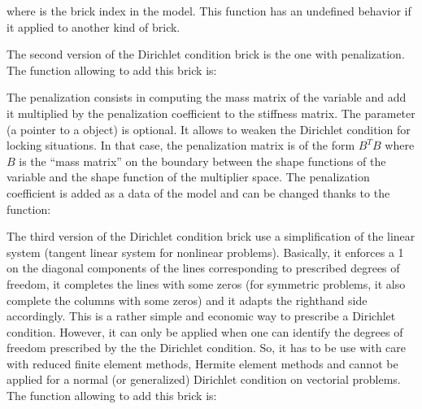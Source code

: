 \documentclass[a4paper,11pt,english]{sphinxmanual}
\begin{document}
where  is the brick index in the model. This function has an
undefined behavior if it applied to another kind of brick.

The second version of the Dirichlet condition brick is the one with penalization.
The function allowing to add this brick is:

\begin{sphinxVerbatim}[commandchars=\\\{\}]
  
                                           
                                            
                                            
\end{sphinxVerbatim}

The penalization consists in computing the mass matrix of the variable and add it
multiplied by the penalization coefficient to the stiffness matrix.
The parameter  (a pointer to a  object) is optional. It allows to weaken the Dirichlet condition for locking situations. In that case, the penalization matrix is of the form \(B^TB\) where \(B\) is the “mass matrix” on the boundary between the shape functions of the variable  and the shape function of the multiplier space.
The penalization coefficient is added as a data of the model and can be
changed thanks to the function:

\begin{sphinxVerbatim}[commandchars=\\\{\}]
  
\end{sphinxVerbatim}

The third version of the Dirichlet condition brick use a simplification of the linear system (tangent linear system for nonlinear problems). Basically, it enforces a 1 on the diagonal components of the lines corresponding to prescribed degrees of freedom, it completes the lines with some zeros (for symmetric problems, it also complete the columns with some zeros) and it adapts the right\sphinxhyphen{}hand side accordingly. This is a rather simple and economic way to prescribe a Dirichlet condition. However, it can only be applied when one can identify the degrees of freedom prescribed by the the Dirichlet condition. So, it has to be use with care with reduced finite element methods, Hermite element methods and cannot be applied for a normal (or generalized) Dirichlet condition on vectorial problems. The function allowing to add this brick is:
\end{document}
